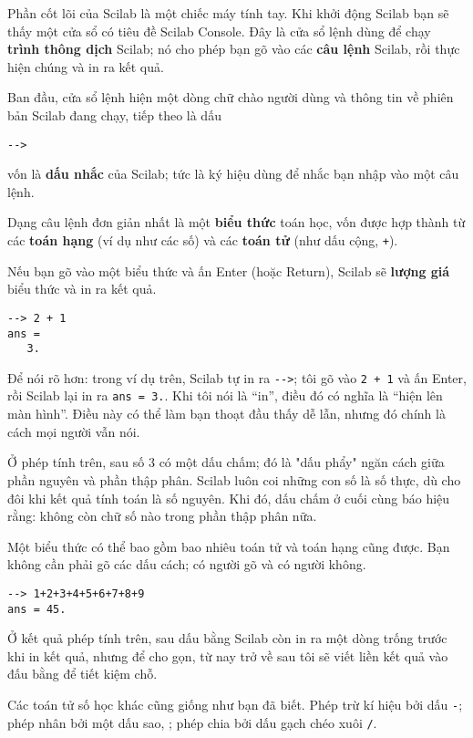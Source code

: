 \documentclass[12pt]{book}
\begin{document}
Phần cốt lõi của Scilab là một chiếc máy tính tay. Khi khởi động Scilab
bạn sẽ thấy một cửa sổ có tiêu đề {\sf Scilab Console}. Đây là 
cửa sổ lệnh dùng để chạy {\bf trình thông dịch} Scilab; nó cho phép bạn gõ
vào các {\bf câu lệnh} Scilab, rồi thực hiện chúng và in ra kết quả.

Ban đầu, cửa sổ lệnh hiện một dòng chữ chào người dùng và thông tin về phiên
bản Scilab đang chạy, tiếp theo là dấu 

\begin{verbatim}
-->
\end{verbatim}

\noindent vốn là {\bf dấu nhắc} của Scilab; tức là ký hiệu dùng để nhắc bạn nhập vào một
câu lệnh.

Dạng câu lệnh đơn giản nhất là một {\bf biểu thức} toán học, vốn được 
hợp thành từ các {\bf toán hạng} (ví dụ như các số) và các 
{\bf toán tử} (như dấu cộng, {\tt +}).

Nếu bạn gõ vào một biểu thức và ấn Enter (hoặc Return), Scilab sẽ 
{\bf lượng giá} biểu thức và in ra kết quả.

\begin{verbatim}
--> 2 + 1
ans = 
   3.
\end{verbatim}

Để nói rõ hơn: trong ví dụ trên, Scilab tự in ra \verb#-->#; tôi  
gõ vào {\tt 2 + 1} và ấn Enter, rồi Scilab lại in ra {\tt ans = 3.}.
Khi tôi nói là ``in'', điều đó có nghĩa là ``hiện lên màn hình''. Điều này
có thể làm bạn thoạt đầu thấy dễ lẫn, nhưng đó chính là cách mọi người
vẫn nói.

Ở phép tính trên, sau số 3 có một dấu chấm; đó là "dấu phẩy" 
ngăn cách giữa phần nguyên và phần thập phân. Scilab luôn coi
những con số là số thực, dù cho đôi khi kết quả tính toán là số nguyên.
Khi đó, dấu chấm ở cuối cùng báo hiệu rằng: không còn chữ số nào
trong phần thập phân nữa.

Một biểu thức có thể bao gồm bao nhiêu toán tử và toán hạng cũng được.
Bạn không cần phải gõ các dấu cách; có người gõ và có người không.

\begin{verbatim}
--> 1+2+3+4+5+6+7+8+9
ans = 45.
\end{verbatim}

Ở kết quả phép tính trên, sau dấu bằng Scilab còn in ra một dòng trống 
trước khi in kết quả, nhưng để cho gọn, từ nay trở về sau tôi sẽ 
viết liền kết quả vào đấu bằng để tiết kiệm chỗ.

Các toán tử số học khác cũng giống như bạn đã biết. Phép trừ kí hiệu 
bởi dấu {\tt -}; phép nhân bởi một dấu sao, {\tt *}; phép chia bởi dấu 
gạch chéo xuôi {\tt /}.
\end{document}
